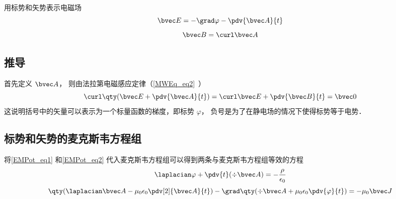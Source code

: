 
\begin{issues}
\issueDraft
\end{issues}


用标势和矢势表示电磁场
\begin{equation}\label{EMPot_eq1}
\bvec E = -\grad \varphi - \pdv{\bvec A}{t}
\end{equation}
\begin{equation}\label{EMPot_eq2}
\bvec B = \curl \bvec A
\end{equation}

\subsection{推导}
首先定义 $\bvec A$， 则由法拉第电磁感应定律（\autoref{MWEq_eq2}~）
\begin{equation}
\curl \qty(\bvec E + \pdv{\bvec A}{t}) = \curl \bvec E + \pdv{\bvec B}{t} = \bvec 0
\end{equation}
这说明括号中的矢量可以表示为一个标量函数的梯度，即标势 $\varphi$， 负号是为了在静电场的情况下使得标势等于电势．

\subsection{标势和矢势的麦克斯韦方程组}

将\autoref{EMPot_eq1} 和\autoref{EMPot_eq2} 代入麦克斯韦方程组可以得到两条与麦克斯韦方程组等效的方程
\begin{equation}\label{EMPot_eq4}
\laplacian \varphi + \pdv{t} (\div \bvec A) = -\frac{\rho}{\epsilon_0}
\end{equation}
\begin{equation}\label{EMPot_eq5}
\qty(\laplacian \bvec A - \mu_0\epsilon_0 \pdv[2]{\bvec A}{t}) - \grad \qty(\div \bvec A + \mu_0\epsilon_0 \pdv{\varphi}{t}) = -\mu_0\bvec J
\end{equation}

